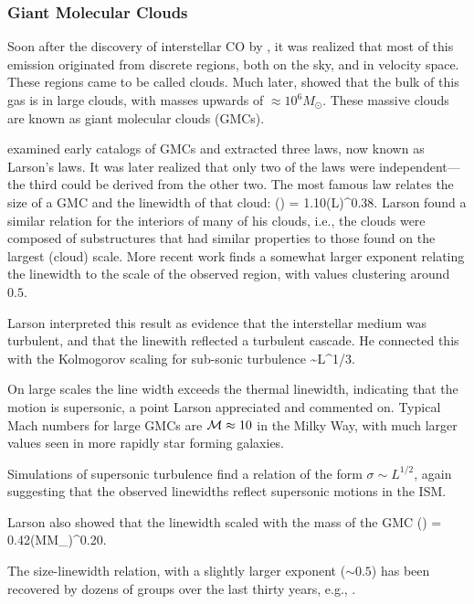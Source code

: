\documentclass[../dissertation.tex]{subfiles}
\begin{document}
\subsubsection{Giant Molecular Clouds}
Soon after the discovery of interstellar CO by \citet{1970ApJ...161L..43W}, it was realized that most of this emission originated from discrete regions, both on the sky, and in velocity space. These regions came to be called clouds. Much later,
\citet{1987ApJ...319..730S}  showed that the bulk of this gas is in large clouds, with masses upwards of $\approx10^6M_\odot$. 
These massive clouds are known as giant molecular clouds (GMCs).

\citet{1981MNRAS.194..809L} examined early catalogs of GMCs and extracted three laws, now known as Larson's laws. It was later realized that only two of the laws were independent---the third could be derived from the other two. The most famous law relates the size of a GMC and the linewidth of that cloud:
%
\be
\left({\sigma\over \kms}\right) = 1.10\left({L\over \pc}\right)^{0.38}.
\ee
%
Larson found a similar relation for the interiors of many of his clouds, i.e., the clouds were composed of substructures that had similar properties to those found on the largest (cloud) scale.
More recent work finds a somewhat larger exponent relating the linewidth to the scale of the observed region, with values clustering around $0.5$.

Larson interpreted this result as evidence that the interstellar medium was turbulent, and that the linewith reflected a turbulent cascade. 
He connected this with the Kolmogorov scaling for sub-sonic turbulence
%
\be
\sigma\sim L^{1/3}.
\ee
%

On large scales the line width exceeds the thermal linewidth, indicating that the motion is supersonic, a point Larson appreciated and commented on. Typical Mach numbers for large GMCs are ${\cal M}\approx 10$ in the Milky Way, with much larger values seen in more rapidly star forming galaxies.

Simulations of supersonic turbulence find a relation of the form $\sigma\sim L^{1/2}$, again suggesting that the observed linewidths reflect supersonic motions in the ISM.

Larson also showed that the linewidth scaled with the mass of the GMC
%
\be
\left({\sigma\over \kms}\right) = 0.42\left({M\over M_\odot}\right)^{0.20}.
\ee
%

The size-linewidth relation, with a slightly larger exponent ($\sim0.5$) has been recovered by dozens of groups over the last thirty years, e.g., \citet{1987ApJ...319..730S,2008ApJ...679.1338R,2017ApJ...834...57M}.
\end{document}
